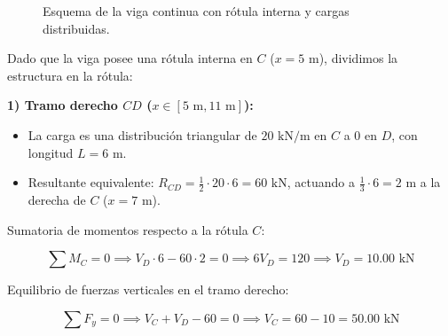 \begin{figure}[H]
{%

    }

    \caption{Esquema de la viga continua con rótula interna y cargas distribuidas.}

\end{figure}






Dado que la viga posee una rótula interna en $C$ ($x = 5\text{ m}$), dividimos la estructura en la rótula:



\textbf{1) Tramo derecho $CD$ ($x \in [5\text{ m}, 11\text{ m}]$):}

\begin{itemize}

    \item La carga es una distribución triangular de $20\text{ kN/m}$ en $C$ a $0$ en $D$, con longitud $L = 6\text{ m}$.

    \item Resultante equivalente: $R_{CD} = \frac{1}{2} \cdot 20 \cdot 6 = 60\text{ kN}$, actuando a $\frac{1}{3} \cdot 6 = 2\text{ m}$ a la derecha de $C$ ($x = 7\text{ m}$).

\end{itemize}



Sumatoria de momentos respecto a la rótula $C$:

\begin{equation}

    \sum M_C = 0 \implies V_D \cdot 6 - 60 \cdot 2 = 0 \implies 6 V_D = 120 \implies \boxed{V_D = 10.00\text{ kN}}

\end{equation}



Equilibrio de fuerzas verticales en el tramo derecho:

\begin{equation}

    \sum F_y = 0 \implies V_C + V_D - 60 = 0 \implies V_C = 60 - 10 = \boxed{50.00\text{ kN}}

\end{equation}



